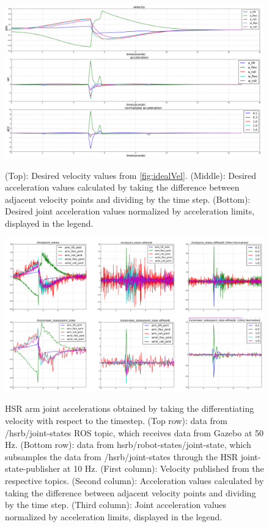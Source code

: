 \documentclass[11pt]{article}
\begin{document}
        \begin{figure}
            \centering
            \includegraphics[width=\linewidth]{2020.05.17/ideal_acc_9_6_fixed.png}
            \label{fig:accelerations_ideal}
            \caption{(Top): Desired velocity values from \cref{fig:idealVel}. (Middle): Desired acceleration values calculated by taking the difference between adjacent velocity points and dividing by the time step. (Bottom): Desired joint acceleration values normalized by acceleration limits, displayed in the legend.} 
        \end{figure}   
        \begin{figure}
            \centering
            \includegraphics[width=\linewidth]{2020.05.17/accelerations_adjusted_fixed.png}
            \label{fig:accelerations_diffed}
            \caption{
                HSR arm joint accelerations obtained by taking the differentiating velocity with respect to the timestep. (Top row): data from /hsrb/joint-states ROS topic, which receives data from Gazebo at 50 Hz. (Bottom row): data from hsrb/robot-states/joint-state, which subsamples the data from /hsrb/joint-states through the HSR joint-state-publisher at 10 Hz. (First column): Velocity published from the respective topics. (Second column): Acceleration values calculated by taking the difference between adjacent velocity points and dividing by the time step. (Third column): Joint acceleration values normalized by acceleration limits, displayed in the legend.} 
        \end{figure}
        
\end{document}
